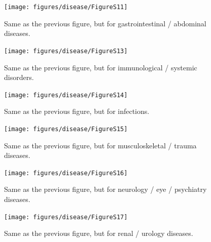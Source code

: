 \documentclass[12pt,twoside]{unicam}
\begin{document}
\begin{figure}

{\centering \texttt{[image: figures/disease/FigureS11]} 

}

\caption[Age-of-onset distributions for the gastrointestinal / abdominal diseases.]{Same as the previous figure, but for gastrointestinal / abdominal diseases.}\label{fig:disFigS11}
\end{figure}

\begin{figure}

{\centering \texttt{[image: figures/disease/FigureS13]} 

}

\caption[Age-of-onset distributions for the immunological / systemic disorders.]{Same as the previous figure, but for immunological / systemic disorders.}\label{fig:disFigS13}
\end{figure}

\begin{figure}

{\centering \texttt{[image: figures/disease/FigureS14]} 

}

\caption[Age-of-onset distributions for infections.]{Same as the previous figure, but for infections.}\label{fig:disFigS14}
\end{figure}

\begin{figure}

{\centering \texttt{[image: figures/disease/FigureS15]} 

}

\caption[Age-of-onset distributions for the musculoskeletal / trauma diseases.]{Same as the previous figure, but for musculoskeletal / trauma diseases.}\label{fig:disFigS15}
\end{figure}

\begin{figure}

{\centering \texttt{[image: figures/disease/FigureS16]} 

}

\caption[Age-of-onset distributions for the neurology / eye / psychiatry diseases.]{Same as the previous figure, but for neurology / eye / psychiatry diseases.}\label{fig:disFigS16}
\end{figure}

\begin{figure}

{\centering \texttt{[image: figures/disease/FigureS17]} 

}

\caption[Age-of-onset distributions for the renal / urology diseases.]{Same as the previous figure, but for renal / urology diseases.}\label{fig:disFigS17}
\end{figure}
\end{document}
